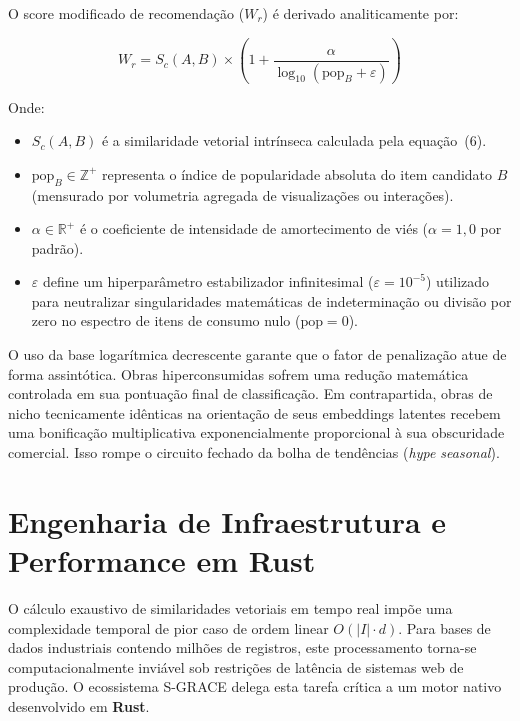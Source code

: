 \documentclass[11pt,a4paper]{article}
\begin{document}
O score modificado de recomendação ($W_r$) é derivado analiticamente por:

\begin{equation}
W_r = S_c(A, B) \times \left(1 + \frac{\alpha}{\log_{10}(\text{pop}_B + \varepsilon)}\right)
\end{equation}

Onde:
\begin{itemize}
    \item $S_c(A, B)$ é a similaridade vetorial intrínseca calculada pela equação~(6).
    \item $\text{pop}_B \in \mathbb{Z}^+$ representa o índice de popularidade absoluta do item
          candidato $B$ (mensurado por volumetria agregada de visualizações ou interações).
    \item $\alpha \in \mathbb{R}^+$ é o coeficiente de intensidade de amortecimento de viés
          ($\alpha = 1{,}0$ por padrão).
    \item $\varepsilon$ define um hiperparâmetro estabilizador infinitesimal
          ($\varepsilon = 10^{-5}$) utilizado para neutralizar singularidades matemáticas de
          indeterminação ou divisão por zero no espectro de itens de consumo nulo
          ($\text{pop} = 0$).
\end{itemize}

O uso da base logarítmica decrescente garante que o fator de penalização atue de forma
assintótica. Obras hiperconsumidas sofrem uma redução matemática controlada em sua pontuação final
de classificação. Em contrapartida, obras de nicho tecnicamente idênticas na orientação de seus
embeddings latentes recebem uma bonificação multiplicativa exponencialmente proporcional à sua
obscuridade comercial. Isso rompe o circuito fechado da bolha de tendências (\textit{hype
seasonal}).


\section{Engenharia de Infraestrutura e Performance em Rust}

O cálculo exaustivo de similaridades vetoriais em tempo real impõe uma complexidade temporal de
pior caso de ordem linear $O(|I| \cdot d)$. Para bases de dados industriais contendo milhões de
registros, este processamento torna-se computacionalmente inviável sob restrições de latência de
sistemas web de produção. O ecossistema S-GRACE delega esta tarefa crítica a um motor nativo
desenvolvido em \textbf{Rust}.
\end{document}
